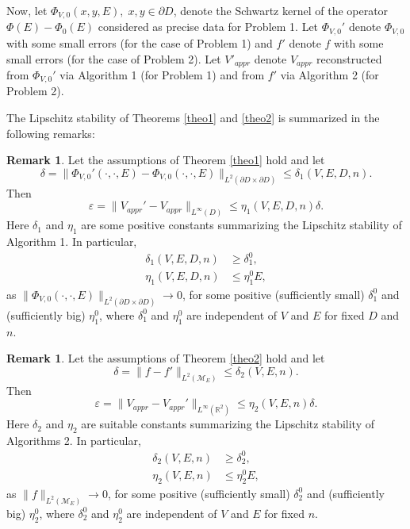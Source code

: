 \documentclass[11pt,a4paper,english,subeqn]{amsart}
\theoremstyle{plain}
\theoremstyle{definition}
\newtheorem{rem}[lem]{Remark}
\numberwithin{equation}{section}
\begin{document}
Now, let $\Phi_{V,0}(x,y,E), \; x,y \in \partial D$, denote the Schwartz kernel of the operator $\Phi(E)-\Phi_0(E)$ considered as precise data for Problem 1. Let $\Phi_{V,0}'$ denote $\Phi_{V,0}$ with some small errors (for the case of Problem 1) and $f'$ denote $f$ with some small errors (for the case of Problem 2). Let $V'_{appr}$ denote $V_{appr}$ reconstructed from $\Phi_{V,0}'$ via Algorithm 1 (for Problem 1) and from $f'$ via Algorithm 2 (for Problem 2).

The Lipschitz stability of Theorems \ref{theo1} and \ref{theo2} is summarized in the following remarks:

\begin{rem} \label{64}
Let the assumptions of Theorem \ref{theo1} hold and let
\begin{equation}
\delta = \|\Phi_{V,0}'(\cdot,\cdot,E) - \Phi_{V,0}(\cdot,\cdot,E) \|_{L^2(\partial D \times \partial D)} \leq \delta_1(V,E,D,n).
\end{equation}
Then
\begin{equation}
\varepsilon = \|V_{appr}' - V_{appr}\|_{L^{\infty}(D)} \leq \eta_1(V,E,D,n) \delta.
\end{equation}
Here $\delta_1$ and $\eta_1$ are some positive constants summarizing the Lipschitz stability of Algorithm 1. In particular,
\begin{align}
\delta_1(V,E,D,n) &\geq \delta_1^0, \\ \label{eta1}
\eta_1(V,E,D,n) &\leq \eta_1^0 E,
\end{align}
as $\| \Phi_{V,0}(\cdot, \cdot, E) \|_{L^2(\partial D \times \partial D)} \to 0$, for some positive (sufficiently small) $\delta_1^0$ and (sufficiently big) $\eta_1^0$, where $\delta_1^0$ and $\eta_1^0$ are independent of $V$ and $E$ for fixed $D$ and $n$.

\end{rem}
\begin{rem} \label{65}
Let the assumptions of Theorem \ref{theo2} hold and let
\begin{equation} \label{errf}
\delta = \|f - f'\|_{L^2({\mathscr{M}_E})} \leq \delta_2(V,E,n).
\end{equation}
Then
\begin{equation}
\varepsilon = \|V_{appr} - V_{appr}'\|_{L^{\infty}({\mathbb{R}}^2)} \leq \eta_2(V,E,n) \delta.
\end{equation}
Here $\delta_2$ and $\eta_2$ are suitable constants summarizing the Lipschitz stability of Algorithms 2. In particular,
\begin{align} \label{delta2}
\delta_2(V,E,n) &\geq \delta_2^0, \\ \label{eta2}
\eta_2(V,E,n) &\leq \eta_2^0 E,
\end{align}
as $\|f\|_{L^2({\mathscr{M}_E})} \to 0$, for some positive (sufficiently small) $\delta_2^0$ and (sufficiently big) $\eta_2^0$, where $\delta_2^0$ and $\eta_2^0$ are independent of $V$ and $E$ for fixed $n$.
\end{rem}
\end{document}
